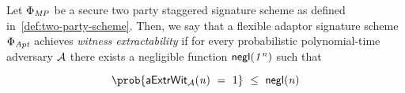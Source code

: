 \begin{definition} 
	
Let $\Phi_{\mathit{MP}}$ be a secure two party staggered signature scheme as defined in~\cref{def:two-party-scheme}. Then, we say that a flexible adaptor signature scheme $\Phi_{\mathit{Apt}}$ achieves \emph{witness extractability} if for every probabilistic polynomial-time adversary $\mathcal{A}$ there exists a negligible function $\mathsf{negl}(\mathit{1^n})$ such that 

	 \[ \prob{\procExpExt{\varN} \opEqNoQ 1} \opSmEq \funNegl{\varN} \]
	
    \begin{center}
        \fbox{
        \begin{varwidth}{\textwidth}
            \procedure[linenumbering]{$\procExpExt{\varN}$} {
            ((\varSecKeyAlice, \varPubKeyAlice), (\varSecKeyBob, \varPubKeyBob)) \opFunResult \procKeyGenPt{\varSecParam}{\varSecParam} \\
            (\varMsg \opSeperate \varStatement) \opFunResult \cnstAdversary^{\procSignOracle{\cdot}{\cdot}}(\varPubKeyAlice, \varPubKeyBob, \varSecKeyBob) \\
            (\varSigAlice \opSeperate \varSigBob)\opFunResult \procSignPt{\varMsg}{\varSecKeyAlice, \varPubKey}{\varSecKeyBob, \varPubKey} \\
            (\varSigAptBob \opSeperate \varSigFin) \opFunResult \cnstAdversary^{\procSignOracle{\cdot}{\cdot}}(\varSigAlice) \\
            \funStar{\varWit} \opFunResult \procExtWit{\varSigFin}{\varSigAlice}{\varSigAptBob} \\
            \pcreturn ((\varStatement \opSeperate \funStar{\varWit}) \opNotIn \cnstRelation \opAnd \procVerFinSig(\varSigFin, \varMsg, \varPubKey))
            }\\

            \procedure[linenumbering]{$\procSignOracle{\varMsg}{\varPubKey}$} {
            \varSet \opAssign \varSet \opUnion \varMsg \\
            (\varSigAlice \opSeperate \varSigBob) \opFunResult \procSignPt{\varMsg}{\varSecKeyAlice, \varPubKey}{\varSecKeyBob, \varPubKey} \\
            \pcreturn  (\varSigAlice \opSeperate \varSigBob)
            }
        \end{varwidth}
        }
    \end{center}
\end{definition}





































